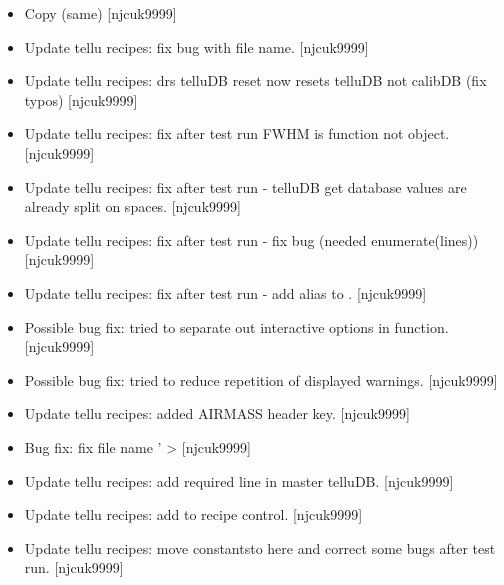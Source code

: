 \documentclass[a4paper,10pt,english]{report}
\begin{document}
\label{\detokenize{misc/changelog:id391}}\begin{itemize}
\item {} 
Copy (same) {[}njcuk9999{]}

\item {} 
Update tellu recipes: fix bug with file name. {[}njcuk9999{]}

\item {} 
Update tellu recipes: drs telluDB reset now resets telluDB not calibDB
(fix typos) {[}njcuk9999{]}

\item {} 
Update tellu recipes: fix after test run FWHM is function not object.
{[}njcuk9999{]}

\item {} 
Update tellu recipes: fix after test run - telluDB get database values
are already split on spaces. {[}njcuk9999{]}

\item {} 
Update tellu recipes: fix after test run - fix bug (needed
enumerate(lines)) {[}njcuk9999{]}

\item {} 
Update tellu recipes: fix after test run - add alias to
. {[}njcuk9999{]}

\item {} 
Possible bug fix: tried to separate out interactive options in
 function. {[}njcuk9999{]}

\item {} 
Possible bug fix: tried to reduce repetition of displayed warnings.
{[}njcuk9999{]}

\item {} 
Update tellu recipes: added AIRMASS header key. {[}njcuk9999{]}

\item {} 
Bug fix: fix file name ’ \textendash{}\textgreater{}
 {[}njcuk9999{]}

\item {} 
Update tellu recipes: add required line in master telluDB. {[}njcuk9999{]}

\item {} 
Update tellu recipes: add  to recipe control.
{[}njcuk9999{]}

\item {} 
Update tellu recipes: move  constantsto here and
correct some bugs after test run. {[}njcuk9999{]}


\end{itemize}
\end{document}
